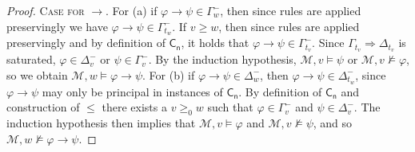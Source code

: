 \documentclass{myifcolog}
\newcommand{\fw}{\mathcal{M}}
\numberwithin{theorem}{section}
\begin{document}
\begin{proof}
\noindent \textsc{Case for $\rightarrow$.} For (a) if $\varphi\rightarrow \psi\in \Gamma^-_w$, then since rules are applied preservingly we have $\varphi \rightarrow \psi \in \Gamma_{t_w}^-$. If $v\geq w$, then since rules are applied preservingly and by definition of $\mathsf{C_n}$, it holds that $\varphi\to \psi\in \Gamma^-_{t_v}$. Since $\Gamma_{t_v} \Rightarrow \Delta_{t_v}$ is saturated, $\varphi \in \Delta^-_v$ or $\psi \in \Gamma^-_v$. By the induction hypothesis, $\fw,v\models \psi$ or $\fw,v\not\models \varphi$, so we obtain $\fw,w\models \varphi\to\psi$. 
   For (b) if $\varphi\to \psi\in \Delta_w^-$, then $\varphi \rightarrow \psi \in \Delta_{t_w}^-$, since $\varphi \rightarrow \psi$ may only be principal in instances of $\mathsf{C_n}$. By definition of $\mathsf{C_n}$ and construction of $\leq$ there exists a $v\geq_0 w$ such that $\varphi\in \Gamma^-_v$ and $\psi\in \Delta^-_v$. The induction hypothesis then implies that $\fw,v\models \varphi$ and $\fw,v\not\models\psi$, and so $\fw,w\not\models \varphi\to\psi$. \smallskip
   

\end{proof}
\end{document}

